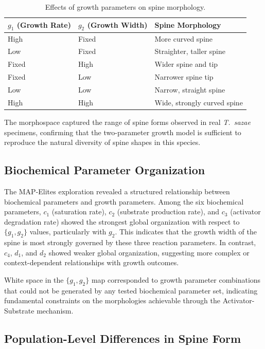 \documentclass[11pt]{article}
\begin{document}
\begin{table}[htbp]
\centering
\caption{Effects of growth parameters on spine morphology.}
\label{tab:morphospace}
\begin{tabular}{lll}
\toprule
\textbf{$g_1$ (Growth Rate)} & \textbf{$g_2$ (Growth Width)} & \textbf{Spine Morphology} \\
\midrule
High & Fixed & More curved spine \\
Low & Fixed & Straighter, taller spine \\
Fixed & High & Wider spine and tip \\
Fixed & Low & Narrower spine tip \\
Low & Low & Narrow, straight spine \\
High & High & Wide, strongly curved spine \\
\bottomrule
\end{tabular}
\end{table}

The morphospace captured the range of spine forms observed in real \textit{T.\ sazae} specimens, confirming that the two-parameter growth model is sufficient to reproduce the natural diversity of spine shapes in this species.

\subsection{Biochemical Parameter Organization}

The MAP-Elites exploration revealed a structured relationship between biochemical parameters and growth parameters. Among the six biochemical parameters, $c_1$ (saturation rate), $c_2$ (substrate production rate), and $c_3$ (activator degradation rate) showed the strongest global organization with respect to $\{g_1, g_2\}$ values, particularly with $g_2$. This indicates that the growth width of the spine is most strongly governed by these three reaction parameters. In contrast, $c_4$, $d_1$, and $d_2$ showed weaker global organization, suggesting more complex or context-dependent relationships with growth outcomes.

White space in the $\{g_1, g_2\}$ map corresponded to growth parameter combinations that could not be generated by any tested biochemical parameter set, indicating fundamental constraints on the morphologies achievable through the Activator-Substrate mechanism.

\subsection{Population-Level Differences in Spine Form}
\end{document}
